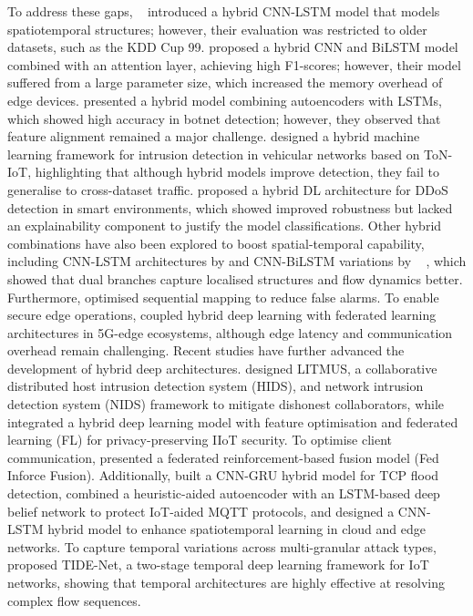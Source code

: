 \documentclass[a4paper,fleqn]{cas-sc}
\begin{document}
To address these gaps, ~\cite{zhao2020hybrid} introduced a hybrid CNN-LSTM model that models spatiotemporal structures; however, their evaluation was restricted to older datasets, such as the KDD Cup 99. \cite{jiang2020network} proposed a hybrid CNN and BiLSTM model combined with an attention layer, achieving high F1-scores; however, their model suffered from a large parameter size, which increased the memory overhead of edge devices. \cite{dong2021novel} presented a hybrid model combining autoencoders with LSTMs, which showed high accuracy in botnet detection; however, they observed that feature alignment remained a major challenge. \cite{gad2021hybrid} designed a hybrid machine learning framework for intrusion detection in vehicular networks based on ToN-IoT, highlighting that although hybrid models improve detection, they fail to generalise to cross-dataset traffic. \cite{alomari2021hybrid} proposed a hybrid DL architecture for DDoS detection in smart environments, which showed improved robustness but lacked an explainability component to justify the model classifications. Other hybrid combinations have also been explored to boost spatial-temporal capability, including CNN-LSTM architectures by \cite{halbouni2022cnnlstm} and CNN-BiLSTM variations by ~ \citep{omarov2023cnnbilstm, HNAMTE2023100053}, which showed that dual branches capture localised structures and flow dynamics better. Furthermore, \cite{sadhwani2025bilstmcnn} optimised sequential mapping to reduce false alarms. To enable secure edge operations, \cite{baidar2025federated} coupled hybrid deep learning with federated learning architectures in 5G-edge ecosystems, although edge latency and communication overhead remain challenging. Recent studies have further advanced the development of hybrid deep architectures. \cite{sanyal2026litmus} designed LITMUS, a collaborative distributed host intrusion detection system (HIDS), and network intrusion detection system (NIDS) framework to mitigate dishonest collaborators, while \cite{fraihat2026hybrid} integrated a hybrid deep learning model with feature optimisation and federated learning (FL) for privacy-preserving IIoT security. To optimise client communication, \cite{khan2024federated} presented a federated reinforcement-based fusion model (Fed Inforce Fusion). Additionally, \cite{ullah2023iotids} built a CNN-GRU hybrid model for TCP flood detection, \cite{vijayan2023automated} combined a heuristic-aided autoencoder with an LSTM-based deep belief network to protect IoT-aided MQTT protocols, and \cite{poddar2024enhancing} designed a CNN-LSTM hybrid model to enhance spatiotemporal learning in cloud and edge networks. To capture temporal variations across multi-granular attack types, \cite{baig2026tide} proposed TIDE-Net, a two-stage temporal deep learning framework for IoT networks, showing that temporal architectures are highly effective at resolving complex flow sequences.
\end{document}
